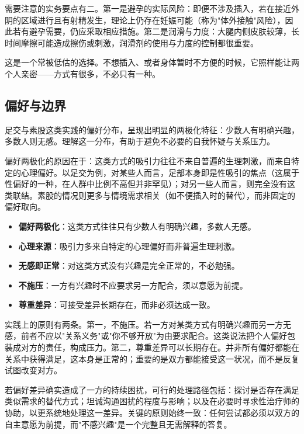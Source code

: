 \documentclass[12pt,UTF8]{ctexbook}
\newcommand{\keyword}[1]{\textbf{#1}}
\begin{document}
需要注意的实务要点有二。第一是避孕的实际风险：即便不涉及插入，若在接近外阴的区域进行且有射精发生，理论上仍存在妊娠可能（称为"体外接触"风险），因此若有避孕需要，仍应采取相应措施。第二是润滑与力度：大腿内侧皮肤较薄，长时间摩擦可能造成擦伤或刺激，润滑剂的使用与力度的控制都很重要。

\begin{tcolorbox}[colback=pink!5!white,colframe=red!50!black,title=贴心小叮咛]
	这是一个常被低估的选择。不想插入、或者身体暂时不方便的时候，它照样能让两个人亲密——方式有很多，不必只有一种。
\end{tcolorbox}
\subsection{偏好与边界}

足交与素股这类实践的偏好分布，呈现出明显的两极化特征：少数人有明确兴趣，多数人则无感。理解这一分布，有助于避免不必要的自我怀疑与关系压力。

偏好两极化的原因在于：这类方式的吸引力往往不来自普遍的生理刺激，而来自特定的心理偏好。以足交为例，对某些人而言，足部本身即是性吸引的焦点（这属于性偏好的一种，在人群中比例不高但并非罕见）；对另一些人而言，则完全没有这类联结。素股的情况则更多与情境需求相关（如不便插入时的替代），而非固定的偏好取向。

\begin{itemize}
	\item \keyword{偏好两极化}：这类方式往往只有少数人有明确兴趣，多数人无感。
	\item \keyword{心理来源}：吸引力多来自特定的心理偏好而非普遍生理刺激。
	\item \keyword{无感即正常}：对这类方式没有兴趣是完全正常的，不必勉强。
	\item \keyword{不施压}：一方有兴趣时不应要求另一方配合，须以意愿为前提。
	\item \keyword{尊重差异}：可接受差异长期存在，而非必须达成一致。
\end{itemize}

实践上的原则有两条。第一，不施压。若一方对某类方式有明确兴趣而另一方无感，前者不应以"关系义务"或"你不够开放"为由要求配合。这类说法把个人偏好包装成对方的责任，构成压力。第二，尊重差异可以长期存在。并非所有偏好都能在关系中获得满足，这本身是正常的；重要的是双方都能接受这一状况，而不是反复试图改变对方。

若偏好差异确实造成了一方的持续困扰，可行的处理路径包括：探讨是否存在满足类似需求的替代方式；坦诚沟通困扰的程度与影响；以及在必要时寻求性治疗师的协助，以更系统地处理这一差异。关键的原则始终一致：任何尝试都必须以双方的自主意愿为前提，而"不感兴趣"是一个完整且无需解释的答复。
\end{document}
